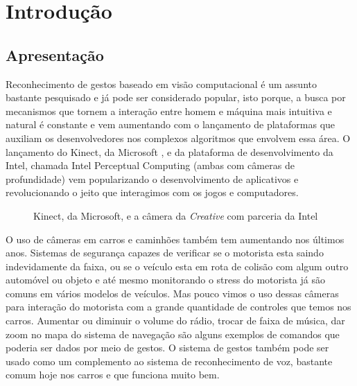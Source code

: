 \chapter{Introdução}

\section{Apresentação}

Reconhecimento de gestos baseado em visão computacional é um assunto bastante pesquisado e já pode ser considerado popular, isto porque, a busca por mecanismos que tornem a interação entre homem e máquina mais intuitiva e natural é constante e vem aumentando com o lançamento de plataformas que auxiliam os desenvolvedores nos complexos algoritmos que envolvem essa área.
O lançamento do Kinect, da Microsoft \cite{kinect}, e da plataforma de desenvolvimento da Intel, chamada Intel Perceptual Computing \cite{intel} (ambas com câmeras de profundidade) vem popularizando o desenvolvimento de aplicativos e revolucionando o jeito que interagimos com os jogos e computadores. 


\begin{figure}[ht!]
\centering
{}
  \caption{Kinect, da Microsoft, e a câmera da \textit{Creative} com parceria da Intel}
  \label{fig:depth_camera}
\end{figure}

O uso de câmeras em carros e caminhões também tem aumentando nos últimos anos. Sistemas de segurança capazes de verificar se o motorista esta saindo indevidamente da faixa, ou se o veículo esta em rota de colisão com algum outro automóvel ou objeto e até mesmo monitorando o stress do motorista já são comuns em vários modelos de veículos. Mas pouco vimos o uso dessas câmeras para interação do motorista com a grande quantidade de controles que temos nos carros. Aumentar ou diminuir o volume do rádio, trocar de faixa de música, dar zoom no mapa do sistema de navegação são alguns exemplos de comandos que poderia ser dados por meio de gestos.
O sistema de gestos também pode ser usado como um complemento ao sistema de reconhecimento de voz, bastante comum hoje nos carros e que funciona muito bem.

